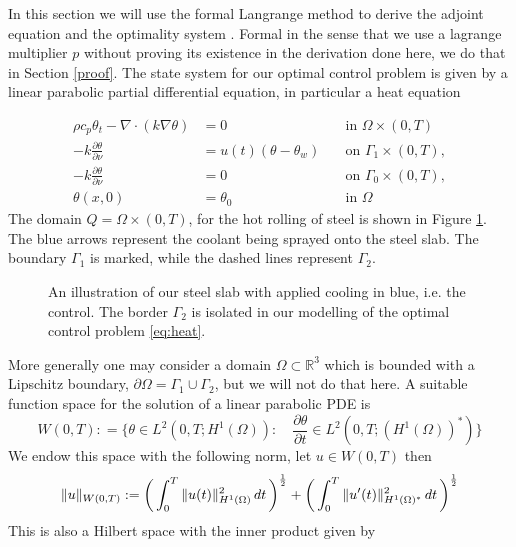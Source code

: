 
In this section we will use the formal Langrange method to derive the adjoint equation and the optimality system \cite{optimalControl}. Formal in the sense that we use a lagrange multiplier $p$ without proving its existence in the derivation done here, we do that in Section \ref{proof}. The state system for our optimal control problem is given by a linear parabolic partial differential equation, in particular a heat equation

\begin{align*}
      \rho c_p \theta_t - \nabla \cdot (k \nabla \theta) &= 0 \quad &\text{in } \Omega \times (0,T) \\
      -k \frac{\partial \theta}{\partial \nu} &= u(t) (\theta - \theta_w) \quad &\text{on } \Gamma_1 \times (0,T), \\
      -k \frac{\partial \theta}{\partial \nu} &= 0 \quad &\text{on } \Gamma_0\times (0,T), \\
      \theta(x, 0) &= \theta_0 \quad &\text{in } \Omega 
\end{align*}
The domain $Q = \Omega \times (0,T)$, for the hot rolling of steel is shown in Figure \ref{fig:steel_slab}. The blue arrows represent the coolant being sprayed onto the steel slab. The boundary $\Gamma_1$ is marked, while the dashed lines represent $\Gamma_2$. 
\begin{figure}
    \centering
    
    \caption{An illustration of our steel slab with applied cooling in blue, i.e. the control. The border $\Gamma_2$ is isolated in our modelling of the optimal control problem \eqref{eq:heat}.}
    \label{fig:steel_slab}
\end{figure}

More generally one may consider a domain $\Omega \subset \mathbb{R}^3$ which is bounded with a Lipschitz boundary, $\partial \Omega = \Gamma_1 \cup \Gamma_2$, but we will not do that here. A suitable function space for the solution of a linear parabolic PDE is 
\begin{equation}
    \label{eq:funcSpace}
    W(0,T) : = \{ \theta \in L^2(0,T;H^1(\Omega)) : \quad \frac{\partial \theta}{\partial t} \in L^2(0,T;(H^1(\Omega))^{*}) \}
\end{equation}
We endow this space with the following norm, let $u \in W(0,T)$ then 
\begin{equation*}
    \|u\|_{W(0,T)} := \bigg (\int_{0}^T\|u(t)\|^2_{H^{1}(\Omega)}\mathop{dt} \bigg ) ^{\frac{1}{2}} + \bigg (\int_{0}^T\|u'(t)\|^2_{H^{1}(\Omega)^{*}}\mathop{dt} \bigg ) ^{\frac{1}{2}}
\end{equation*}
This is also a Hilbert space with the inner product given by 

